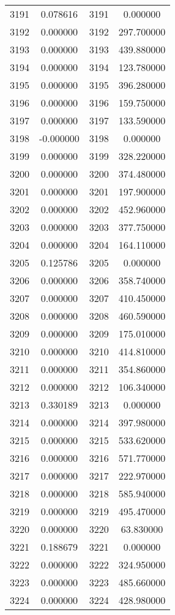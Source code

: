 \documentclass[12pt]{article}
\begin{document}
\begin{longtable}{@{}cccc@{}}
3191 & 0.078616 & 3191 & 0.000000 \\
3192 & 0.000000 & 3192 & 297.700000 \\
3193 & 0.000000 & 3193 & 439.880000 \\
3194 & 0.000000 & 3194 & 123.780000 \\
3195 & 0.000000 & 3195 & 396.280000 \\
3196 & 0.000000 & 3196 & 159.750000 \\
3197 & 0.000000 & 3197 & 133.590000 \\
3198 & -0.000000 & 3198 & 0.000000 \\
3199 & 0.000000 & 3199 & 328.220000 \\
3200 & 0.000000 & 3200 & 374.480000 \\
3201 & 0.000000 & 3201 & 197.900000 \\
3202 & 0.000000 & 3202 & 452.960000 \\
3203 & 0.000000 & 3203 & 377.750000 \\
3204 & 0.000000 & 3204 & 164.110000 \\
3205 & 0.125786 & 3205 & 0.000000 \\
3206 & 0.000000 & 3206 & 358.740000 \\
3207 & 0.000000 & 3207 & 410.450000 \\
3208 & 0.000000 & 3208 & 460.590000 \\
3209 & 0.000000 & 3209 & 175.010000 \\
3210 & 0.000000 & 3210 & 414.810000 \\
3211 & 0.000000 & 3211 & 354.860000 \\
3212 & 0.000000 & 3212 & 106.340000 \\
3213 & 0.330189 & 3213 & 0.000000 \\
3214 & 0.000000 & 3214 & 397.980000 \\
3215 & 0.000000 & 3215 & 533.620000 \\
3216 & 0.000000 & 3216 & 571.770000 \\
3217 & 0.000000 & 3217 & 222.970000 \\
3218 & 0.000000 & 3218 & 585.940000 \\
3219 & 0.000000 & 3219 & 495.470000 \\
3220 & 0.000000 & 3220 & 63.830000 \\
3221 & 0.188679 & 3221 & 0.000000 \\
3222 & 0.000000 & 3222 & 324.950000 \\
3223 & 0.000000 & 3223 & 485.660000 \\
3224 & 0.000000 & 3224 & 428.980000 \\

\end{longtable}
\end{document}
